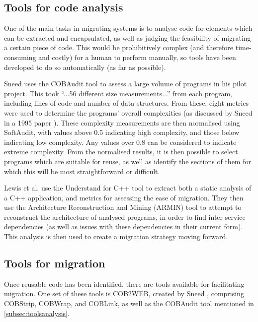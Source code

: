\documentclass[12pt,journal,compsoc]{IEEEtran}
\begin{document}
\subsection{Tools for code analysis}
\label{subsec:toolsanalysis}
One of the main tasks in migrating systems is to analyse code for elements which can be extracted and encapsulated, as well as judging the feasibility of migrating a certain piece of code. This would be prohibitively complex (and therefore time-consuming and costly) for a human to perform manually, so tools have been developed to do so automatically (as far as possible).

Sneed \cite{Sneed2009} uses the COBAudit tool to assess a large volume of programs in his pilot project. This took ``...56 different size measurements...'' \cite{Sneed2009} from each program, including lines of code and number of data structures. From these, eight metrics were used to determine the programs' overall complexities (as discussed by Sneed in a 1995 paper \cite{Sneed1995}). These complexity measurements are then normalised using SoftAudit, with values above 0.5 indicating high complexity, and those below indicating low complexity. Any values over 0.8 can be considered to indicate extreme complexity. From the normalised results, it is then possible to select programs which are suitable for reuse, as well as identify the sections of them for which this will be most straightforward or difficult.

Lewis et al. \cite{Lewis2005a} use the Understand for C++ tool to extract both a static analysis of a C++ application, and metrics for assessing the ease of migration. They then use the Architecture Reconstruction and Mining (ARMIN) \cite{O'Brien2005} tool to attempt to reconstruct the architecture of analysed programs, in order to find inter-service dependencies (as well as issues with these dependencies in their current form). This analysis is then used to create a migration strategy moving forward.

\subsection{Tools for migration}
\label{subsec:toolsmigration}
Once reusable code has been identified, there are tools available for facilitating migration. One set of these tools is COB2WEB, created by Sneed \cite{Sneed2008}, comprising COBStrip, COBWrap, and COBLink, as well as the COBAudit tool mentioned in \autoref{subsec:toolsanalysis}.
\end{document}
